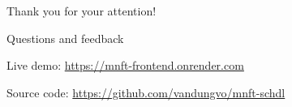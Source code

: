 \begin{frame}[plain]
\centering
\vfill
{\Huge Thank you for your attention!\par}
\vspace{1em}
{\large Questions and feedback\par}
\vspace{1.2em}
{\small Live demo: \url{https://mnft-frontend.onrender.com}\par}
\vspace{0.2em}
{\small Source code: \url{https://github.com/vandungvo/mnft-schdl}\par}
\vfill
\end{frame}


